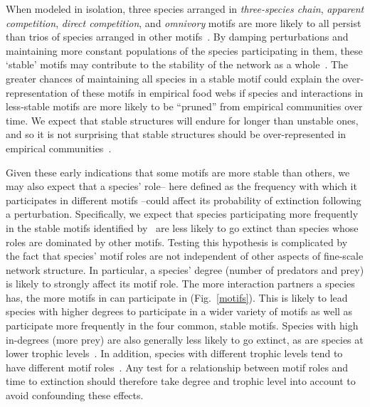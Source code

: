 \documentclass[12pt]{article}
\begin{document}
\begin{spacing}{2.0}
	When modeled in isolation, three species arranged in \emph{three-species chain}, \emph{apparent competition}, \emph{direct competition}, and \emph{omnivory} motifs are more likely to all persist than trios of species arranged in other motifs~\citep{Borrelli2015a}.
	By damping perturbations and maintaining more constant populations of the species participating in them, these `stable' motifs may contribute to the stability of the network as a whole~\citep{Borrelli2015a}. 
    The greater chances of maintaining all species in a stable motif could explain the over-representation of these motifs in empirical food webs if species and interactions in less-stable motifs are more likely to be ``pruned'' from empirical communities over time. We expect that stable structures will endure for longer than unstable ones, and so it is not surprising that stable structures should be over-represented in empirical communities~\citep{Borrelli2015}.


	Given these early indications that some motifs are more stable than others, we may also expect that a species' role-- here defined as the frequency with which it participates in different motifs --could affect its probability of extinction following a perturbation.
	Specifically, we expect that species participating more frequently in the stable motifs identified by~\citet{Borrelli2015a} are less likely to go extinct than species whose roles are dominated by other motifs.
	Testing this hypothesis is complicated by the fact that species' motif roles are not independent of other aspects of fine-scale network structure. 
    In particular, a species' degree (number of predators and prey) is likely to strongly affect its motif role.
    The more interaction partners a species has, the more motifs in can participate in (Fig.~\ref{motifs}).
    This is likely to lead species with higher degrees to participate in a wider variety of motifs as well as participate more frequently in the four common, stable motifs.
    Species with high in-degrees (more prey) are also generally less likely to go extinct, as are species at lower trophic levels~\citep{Cirtwill2018FoodWebs}.
    In addition, species with different trophic levels tend to have different motif roles~\citep{Cirtwill2018EcolLett}.
    Any test for a relationship between motif roles and time to extinction should therefore take degree and trophic level into account to avoid confounding these effects.  
    

\end{spacing}
\end{document}
